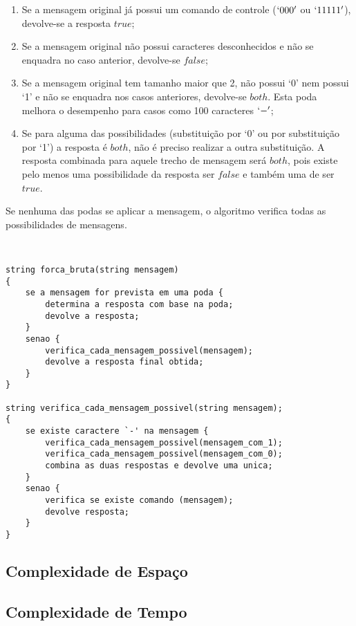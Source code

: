 \documentclass[a4paper,12pt,titlepage]{article}
\begin{document}
\begin{enumerate}[leftmargin=1.5cm]
    \item Se a mensagem original já possui um comando de controle ($`000'$ ou $`11111'$), devolve-se a resposta $true$;  
    \item Se a mensagem original não possui caracteres desconhecidos e não se enquadra no caso anterior, devolve-se $false$;
    \item Se a mensagem original tem tamanho maior que 2, não possui `0' nem possui `1' e não se enquadra nos casos anteriores, devolve-se $both$. Esta poda melhora o desempenho para casos como 100 caracteres $`-'$;
    \item Se para alguma das possibilidades (substituição por `0' ou por substituição por `1') a resposta é $both$, não é preciso realizar a outra substituição. A resposta combinada para aquele trecho de mensagem será $both$, pois existe pelo menos uma possibilidade da resposta ser $false$ e também uma de ser $true$.
    \ \\
\end{enumerate}

Se nenhuma das podas se aplicar a mensagem, o algoritmo verifica todas as possibilidades de mensagens.

\ \\ 
\begin{lstlisting}[caption=Algoritmo de Força Bruta]
string forca_bruta(string mensagem)
{
    se a mensagem for prevista em uma poda {
        determina a resposta com base na poda;
        devolve a resposta;
    } 
    senao {
        verifica_cada_mensagem_possivel(mensagem);
        devolve a resposta final obtida;
    }
}

string verifica_cada_mensagem_possivel(string mensagem);
{
    se existe caractere `-' na mensagem {
        verifica_cada_mensagem_possivel(mensagem_com_1);
        verifica_cada_mensagem_possivel(mensagem_com_0);
        combina as duas respostas e devolve uma unica;
    }
    senao {
        verifica se existe comando (mensagem);
        devolve resposta;
    }
}
\end{lstlisting}

\subsection{Complexidade de Espaço}
\subsection{Complexidade de Tempo}
\end{document}
